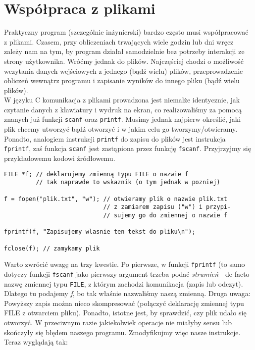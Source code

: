 \documentclass{instrukcja}
\begin{document}
\author{B. Górecki}
\materialtitle


\section{Współpraca z plikami}
Praktyczny program (szczególnie inżynierski) bardzo często musi współpracować z plikami. Czasem, przy obliczeniach trwających wiele godzin lub dni wręcz zależy nam na tym, by program działał samodzielnie bez potrzeby interakcji ze strony użytkownika. Wróćmy jednak do plików. Najczęściej chodzi o możliwość wczytania danych wejściowych z jednego (bądź wielu) plików, przeprowadzenie obliczeń wewnątrz programu i zapisanie wyników do innego pliku (bądź wielu plików).\\
W języku C komunikacja z plikami prowadzona jest niemalże identycznie, jak czytanie danych z klawiatury i wydruk na ekran, co realizowaliśmy za pomocą znanych już funkcji {\tt scanf} oraz {\tt printf}. Musimy jednak najpierw określić, jaki plik chcemy utworzyć bądź otworzyć i w jakim celu go tworzymy/otwieramy. Ponadto, analogiem instrukcji {\tt printf} do zapisu do plików jest instrukcja {\tt fprintf}, zaś funkcja {\tt scanf} jest zastąpiona przez funkcję {\tt fscanf}. Przyjrzyjmy się przykładowemu kodowi źródłowemu.
\begin{verbatim}
FILE *f; // deklarujemy zmienną typu FILE o nazwie f
         // tak naprawde to wskaznik (o tym jednak w pozniej)

f = fopen("plik.txt", "w"); // otwieramy plik o nazwie plik.txt
                            // z zamiarem zapisu ("w") i przypi-
                            // sujemy go do zmiennej o nazwie f

fprintf(f, "Zapisujemy wlasnie ten tekst do pliku\n");

fclose(f); // zamykamy plik
\end{verbatim}
Warto zwrócić uwagę na trzy kwestie. Po pierwsze, w funkcji {\tt fprintf} (to samo dotyczy funkcji {\tt fscanf} jako pierwszy argument trzeba podać {\it strumień} - de facto nazwę zmiennej typu {\tt FILE}, z którym zachodzi komunikacja (zapis lub odczyt). Dlatego tu podajemy {\it f}, bo tak właśnie nazwaliśmy naszą zmienną. Druga uwaga: Powyższy zapis można nieco skompresować (połączyć deklarację zmiennej typu FILE z otwarciem pliku). Ponadto, istotne jest, by sprawdzić, czy plik udało się otworzyć. W przeciwnym razie jakiekolwiek operacje nie miałyby sensu lub skończyły się błędem naszego programu. Zmodyfikujmy więc nasze instrukcje. Teraz wyglądają tak:
\end{document}
